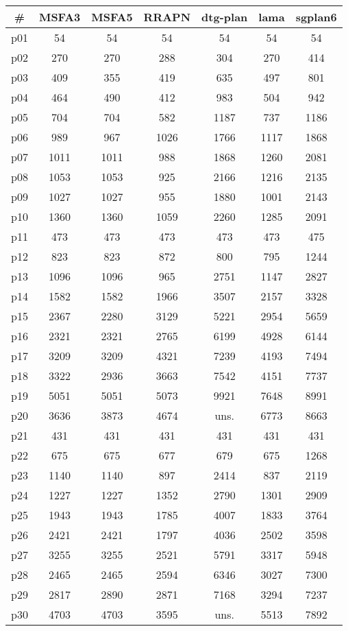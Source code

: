 \begin{tabular}{ccccccc}
\toprule
\textbf{\#} & \textbf{MSFA3} & \textbf{MSFA5} & \textbf{RRAPN} & \textbf{dtg-plan} & \textbf{lama} & \textbf{sgplan6}\\
\midrule
p01 & 54 & 54 & 54 & 54 & 54 & 54\\
p02 & 270 & 270 & 288 & 304 & 270 & 414\\
p03 & 409 & 355 & 419 & 635 & 497 & 801\\
p04 & 464 & 490 & 412 & 983 & 504 & 942\\
p05 & 704 & 704 & 582 & 1187 & 737 & 1186\\
p06 & 989 & 967 & 1026 & 1766 & 1117 & 1868\\
p07 & 1011 & 1011 & 988 & 1868 & 1260 & 2081\\
p08 & 1053 & 1053 & 925 & 2166 & 1216 & 2135\\
p09 & 1027 & 1027 & 955 & 1880 & 1001 & 2143\\
p10 & 1360 & 1360 & 1059 & 2260 & 1285 & 2091\\
p11 & 473 & 473 & 473 & 473 & 473 & 475\\
p12 & 823 & 823 & 872 & 800 & 795 & 1244\\
p13 & 1096 & 1096 & 965 & 2751 & 1147 & 2827\\
p14 & 1582 & 1582 & 1966 & 3507 & 2157 & 3328\\
p15 & 2367 & 2280 & 3129 & 5221 & 2954 & 5659\\
p16 & 2321 & 2321 & 2765 & 6199 & 4928 & 6144\\
p17 & 3209 & 3209 & 4321 & 7239 & 4193 & 7494\\
p18 & 3322 & 2936 & 3663 & 7542 & 4151 & 7737\\
p19 & 5051 & 5051 & 5073 & 9921 & 7648 & 8991\\
p20 & 3636 & 3873 & 4674 & uns. & 6773 & 8663\\
p21 & 431 & 431 & 431 & 431 & 431 & 431\\
p22 & 675 & 675 & 677 & 679 & 675 & 1268\\
p23 & 1140 & 1140 & 897 & 2414 & 837 & 2119\\
p24 & 1227 & 1227 & 1352 & 2790 & 1301 & 2909\\
p25 & 1943 & 1943 & 1785 & 4007 & 1833 & 3764\\
p26 & 2421 & 2421 & 1797 & 4036 & 2502 & 3598\\
p27 & 3255 & 3255 & 2521 & 5791 & 3317 & 5948\\
p28 & 2465 & 2465 & 2594 & 6346 & 3027 & 7300\\
p29 & 2817 & 2890 & 2871 & 7168 & 3294 & 7237\\
p30 & 4703 & 4703 & 3595 & uns. & 5513 & 7892\\
\bottomrule
\end{tabular}

